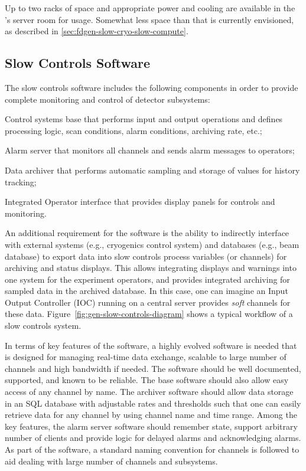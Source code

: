Up to two racks of space and appropriate power and cooling are
available in the 's  server room for  usage.
Somewhat less space than that is currently envisioned, as described in
\ref{sec:fdgen-slow-cryo-slow-compute}.

\subsection{Slow Controls Software}
\label{sec:fdgen-slow-cryo-sw}


The slow controls software includes the following components in order 
to provide complete monitoring and control of detector subsystems:
%
\begin{description}
 \item{Control systems base} that performs input and output operations
  and defines processing logic, scan conditions, alarm conditions,
  archiving rate, etc.;
 \item{Alarm server} that monitors all channels and sends alarm
  messages to operators; 
 \item{Data archiver} that performs automatic sampling and storage of
  values for history tracking;
 \item{Integrated Operator interface} that provides display panels for
  controls and monitoring.
\end{description}

An additional requirement for the software is the ability to indirectly
interface with external systems (e.g., cryogenics control
system) and databases (e.g., beam database) to export data into
slow controls process variables (or channels) for archiving and status
displays. This allows integrating displays and warnings into one
system for the experiment operators, and %
provides integrated
archiving for sampled data in the archived database. In this case, one
can imagine an Input Output Controller (IOC) running on a central 
server provides \textit{soft} channels for these data.
Figure~\ref{fig:gen-slow-controls-diagram} shows a typical workflow of a
slow controls system.

In terms of key features of the software, a highly evolved software is
needed that is designed for managing real-time data exchange, scalable
to large number of channels and high bandwidth if needed. The software
should be well documented, supported, and known to be reliable. The base
software should also allow easy access of any channel by name. The
archiver software should allow data storage in an SQL database with
adjustable rates and thresholds such that one can easily retrieve data
for any channel by using channel name and time range. Among the key
features, the alarm server software should remember state, support
arbitrary number of clients and provide logic for delayed alarms and
acknowledging alarms. As part of the software, a standard naming
convention for channels is followed to aid dealing with large
number of channels and subsystems.


